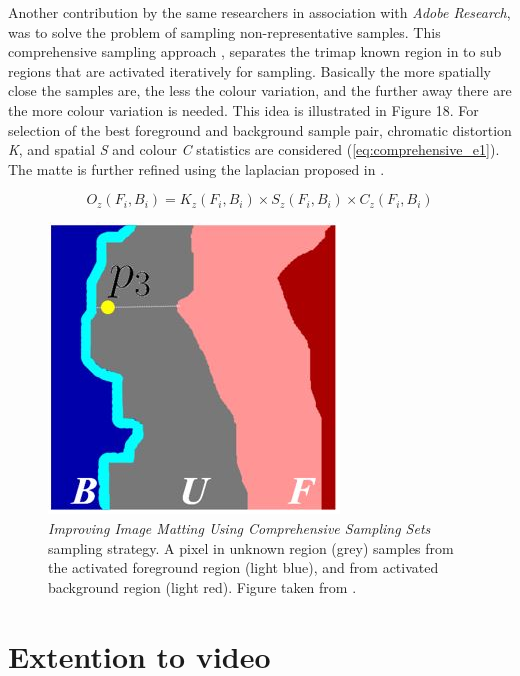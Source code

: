 Another contribution by the same researchers in association with \textit{Adobe Research}, was to solve the problem of sampling non-representative samples. This comprehensive sampling approach \cite{comprehensive}, separates the trimap known region in to sub regions that are activated iteratively for sampling. Basically the more spatially close the samples are, the less the colour variation, and the further away there are the more colour variation is needed. This idea is illustrated in Figure 18. For selection of the best foreground and background sample pair, chromatic distortion \textit{K}, and spatial \textit{S} and colour \textit{C} statistics are considered (\ref{eq:comprehensive_e1}). The matte is further refined using the laplacian proposed in \cite{closedform}.

\begin{equation} \label{eq:comprehensive_e1}
O_{z}(F_{i},B_{i})=K_{z}(F_{i},B_{i})\times S_{z}(F_{i},B_{i})\times C_{z}(F_{i},B_{i})
\end{equation}

\begin{figure}[t!]
\centering
\includegraphics[width=0.4\columnwidth]{Chapter2/2/comprehensive_figure_1.jpg}
\caption[Comprehensive matting sampling strategy.]{\textit{Improving Image Matting Using Comprehensive Sampling Sets} sampling strategy. A pixel in unknown region (grey) samples from the activated foreground region (light blue), and from activated background region (light red). Figure taken from \cite{comprehensive}.}
\label{fig:comprehensive-f1}
\end{figure}

\section{Extention to video}
\label{sec:extention-to-video}

